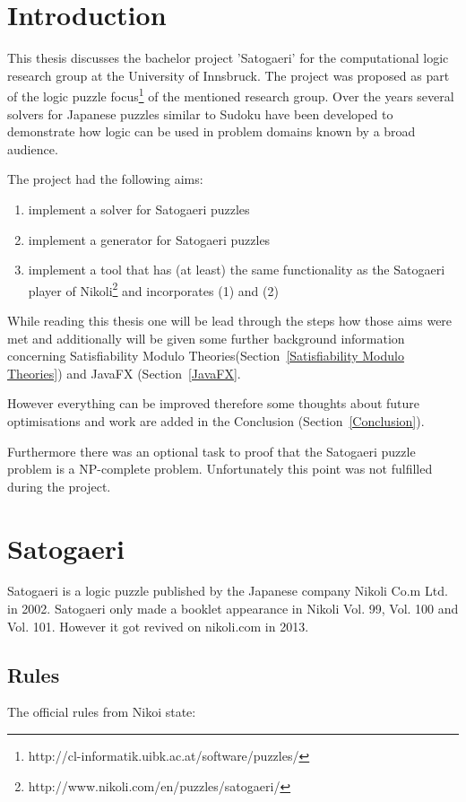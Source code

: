 
\section{Introduction} \label{Introduction}
This thesis discusses the bachelor project 'Satogaeri' for the computational logic research group at the University of Innsbruck. The project was proposed as part of the logic puzzle focus\footnote{http://cl-informatik.uibk.ac.at/software/puzzles/} of the mentioned research group. Over the years several solvers for Japanese puzzles similar to Sudoku have been developed to demonstrate how logic can be used in problem domains known by a broad audience.

The project had the following aims: 
\begin{enumerate}
	\item implement a solver for Satogaeri puzzles
	\item implement a generator for Satogaeri puzzles
	\item implement a tool that has (at least) the same functionality as the Satogaeri player of Nikoli\footnote{http://www.nikoli.com/en/puzzles/satogaeri/} and incorporates (1) and (2)
\end{enumerate}

While reading this thesis one will be lead through the steps how those aims were met and additionally will be given some further background information concerning Satisfiability Modulo Theories(Section~\ref{Satisfiability Modulo Theories}) and JavaFX (Section~\ref{JavaFX}.

However everything can be improved therefore some thoughts about future optimisations and work are added in the Conclusion (Section~\ref{Conclusion}).

Furthermore there was an optional task to proof that the Satogaeri puzzle problem is a NP-complete problem. Unfortunately this point was not fulfilled during the project.

\section{Satogaeri} \label{Satogaeri}
Satogaeri is a logic puzzle published by the Japanese company Nikoli Co.m Ltd. in 2002. Satogaeri only made a booklet appearance in Nikoli Vol. 99, Vol. 100 and Vol. 101. However it got revived on nikoli.com in 2013.

\subsection{Rules}
The official rules from Nikoi state:

